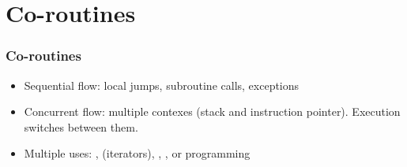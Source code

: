 \section{Co-routines}
\begin{frame}[fragile]
\frametitle{Co-routines}
\begin{itemize}
\item Sequential flow: local jumps, subroutine calls, exceptions
\item Concurrent flow: multiple contexes (stack and instruction pointer). Execution switches between them.
\item Multiple uses: ,  (iterators), , ,  or  programming
\end{itemize}
\end{frame}

